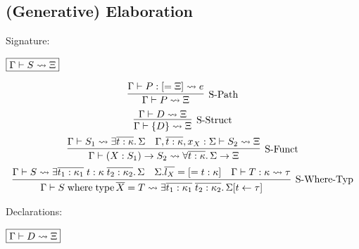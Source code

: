 \subsection{(Generative) Elaboration}

Signature:

$\fbox{$\Gamma \vdash S \rightsquigarrow \Xi$}$

\begin{gather*}
  \infer[\text{S-Path}]{\Gamma \vdash P \elaborate \Xi}{
    \Gamma \vdash P: [= \Xi] \elaborate e
  }
  \\
  \infer[\text{S-Struct}]{\Gamma \vdash \{D\} \elaborate \Xi}{
    \Gamma \vdash D \elaborate \Xi
  }
  \\
  \infer[\text{S-Funct}]{\Gamma \vdash (X: S_1) \to S_2 \elaborate \forall \overline{t: \kappa}\ldotp \Sigma \to \Xi}{
    \Gamma \vdash S_1 \elaborate \exists \overline{t: \kappa}\ldotp \Sigma
    &
    \Gamma, \overline{t: \kappa}, x_X: \Sigma \vdash S_2 \elaborate \Xi
  }
  \\
  \infer[\text{S-Where-Typ}]{\Gamma \vdash S \symwhere \symtype \overline{X} = T \elaborate \exists \overline{t_1: \kappa_1}\; \overline{t_2: \kappa_2}\ldotp \Sigma[t \assign \tau]}{
    \Gamma \vdash S \elaborate \exists \overline{t_1: \kappa_1}\; t: \kappa\; \overline{t_2: \kappa_2} \ldotp \Sigma
    &
    \Sigma.\overline{l_X} = [= t: \kappa]
    &
    \Gamma \vdash T: \kappa \elaborate \tau
  }
\end{gather*}

Declarations:

$\fbox{$\Gamma \vdash D \rightsquigarrow \Xi$}$

